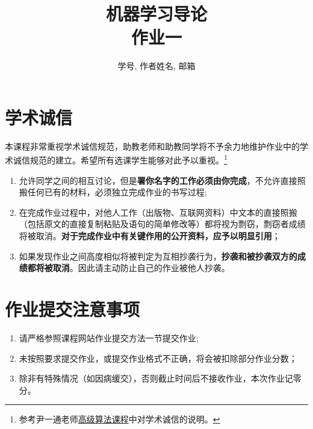 \documentclass[a4paper,UTF8]{article}
\numberwithin{equation}{section}
\begin{document}
\title{机器学习导论\\
作业一}
\author{学号, 作者姓名, 邮箱}
\maketitle

\section*{学术诚信}

本课程非常重视学术诚信规范，助教老师和助教同学将不予余力地维护作业中的学术诚信规范的建立。希望所有选课学生能够对此予以重视。\footnote{参考尹一通老师\href{http://tcs.nju.edu.cn/wiki/index.php/\%E9\%9A\%8F\%E6\%9C/\%BA\%E7\%AE\%97\%E6\%B3\%95\_(Fall\_2015)}{高级算法课程}中对学术诚信的说明。}

\begin{tcolorbox}
\begin{enumerate}
  \item[(1)] 允许同学之间的相互讨论，但是{\color{red}\textbf{署你名字的工作必须由你完成}}，不允许直接照搬任何已有的材料，必须独立完成作业的书写过程;
  \item[(2)] 在完成作业过程中，对他人工作（出版物、互联网资料）中文本的直接照搬（包括原文的直接复制粘贴及语句的简单修改等）都将视为剽窃，剽窃者成绩将被取消。{\color{red}\textbf{对于完成作业中有关键作用的公开资料，应予以明显引用}}；
  \item[(3)] 如果发现作业之间高度相似将被判定为互相抄袭行为，{\color{red}\textbf{抄袭和被抄袭双方的成绩都将被取消}}。因此请主动防止自己的作业被他人抄袭。
\end{enumerate}
\end{tcolorbox}

\section*{作业提交注意事项}
\begin{tcolorbox}
\begin{enumerate}
  \item[(1)] 请严格参照课程网站作业提交方法一节提交作业;
  \item[(2)] 未按照要求提交作业，或提交作业格式不正确，将会被扣除部分作业分数；
  \item[(3)] 除非有特殊情况（如因病缓交），否则截止时间后不接收作业，本次作业记零分。
\end{enumerate}
\end{tcolorbox}

\newpage
\end{document}
